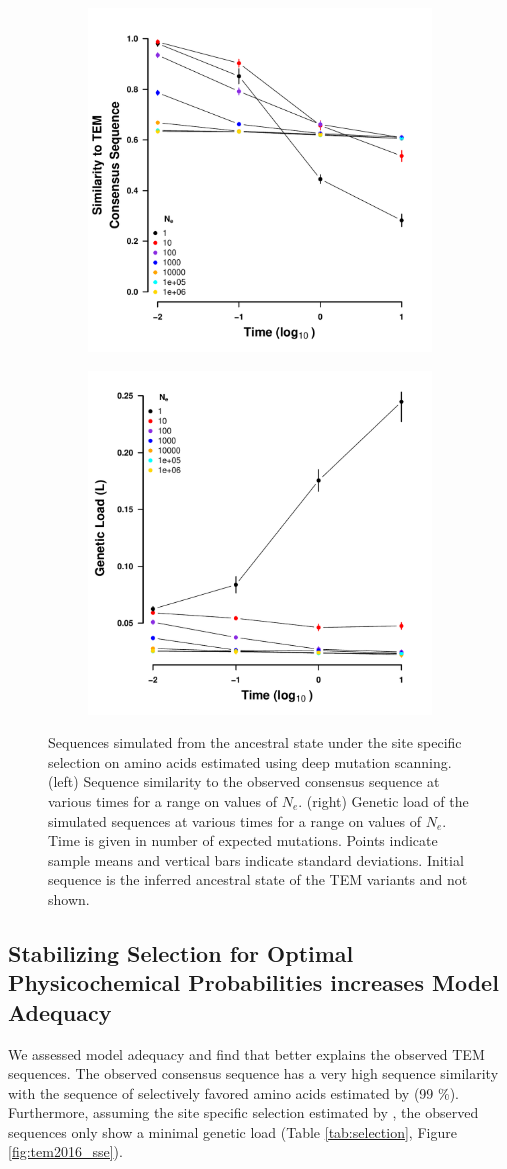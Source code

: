 \documentclass[12pt]{article}
\begin{document}
\begin{figure}[h]
    \centering
    \begin{subfigure}
        \centering
        \includegraphics[width=.45\textwidth]{img/simulated_dist_time_DMS_ancest.pdf}
    \end{subfigure}
    \begin{subfigure}
        \centering
        \includegraphics[width=.45\textwidth]{img/simulated_gl_time_DMS_ancest.pdf}
    \end{subfigure}
    \caption{Sequences simulated from the ancestral state under the site specific selection on amino acids estimated using deep mutation scanning. 
    (left) Sequence similarity to the observed consensus sequence at various times for a range on values of $N_e$.
    (right) Genetic load of the simulated sequences at various times for a range on values of $N_e$.
    Time is given in number of expected mutations.
    Points indicate sample means and vertical bars indicate standard deviations. Initial sequence is the inferred ancestral state of the TEM variants and not shown.}
    \label{fig:dms_sim}
\end{figure}

\subsection*{Stabilizing Selection for Optimal Physicochemical Probabilities increases Model Adequacy} 
We assessed model adequacy and find that \selac better explains the observed TEM sequences.
The observed consensus sequence has a very high sequence similarity with the sequence of selectively favored amino acids estimated by \selac (99 \%).
Furthermore, assuming the site specific selection estimated by \selac, the observed sequences only show a minimal genetic load (Table \ref{tab:selection}, Figure \ref{fig:tem2016_sse}).
\end{document}
